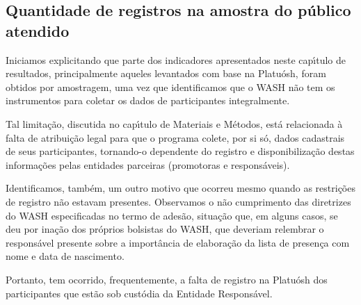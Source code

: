 \documentclass[
12pt,		%
openright,	%
twoside,  %
a4paper,			%
chapter=TITLE,		%
english,			%
french,				%
spanish,			%
brazil				%
]{USPSC-classe/USPSC}
\begin{document}
\subsection[Quantidade de registros na amostra do p\'ublico atendido]{Quantidade de registros na amostra do p\'ublico atendido}\label{Quantidade de registros na amostra do p\'ublico atendido}
Iniciamos explicitando que parte dos indicadores apresentados neste cap\'{\i}tulo de resultados, principalmente aqueles levantados com base na Platu\'osh, foram obtidos por amostragem, uma vez que identificamos que o WASH n\~ao tem os instrumentos para coletar os dados de participantes integralmente.

















Tal limita\c{c}\~ao, discutida no cap\'{\i}tulo de Materiais e M\'etodos, est\'a relacionada \`a falta de atribui\c{c}\~ao legal para que o programa colete, por si s\'o, dados cadastrais de seus participantes, tornando-o dependente do registro e disponibiliza\c{c}\~ao destas informa\c{c}\~oes pelas entidades parceiras (promotoras e respons\'aveis).

















Identificamos, tamb\'em, um outro motivo que ocorreu mesmo quando as restri\c{c}\~oes de registro n\~ao estavam presentes. Observamos o n\~ao cumprimento das diretrizes do WASH especificadas no termo de ades\~ao, situa\c{c}\~ao que, em alguns casos, se deu por ina\c{c}\~ao dos pr\'oprios bolsistas do WASH, que deveriam relembrar o respons\'avel presente sobre a import\^ancia de elabora\c{c}\~ao da lista de presen\c{c}a com nome e data de nascimento.

















Portanto, tem ocorrido, frequentemente, a falta de registro na Platu\'osh dos participantes que est\~ao sob cust\'odia da Entidade Respons\'avel.
\end{document}
